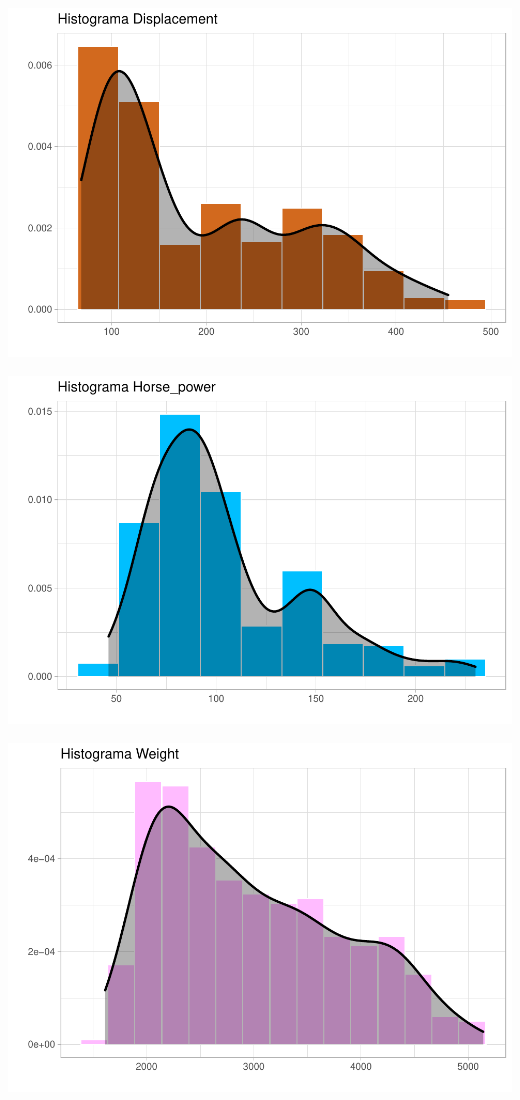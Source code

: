 \begin{center}\includegraphics{img/EDA_files/figure-latex/unnamed-chunk-7-1} \end{center}
\begin{center}\includegraphics{img/EDA_files/figure-latex/unnamed-chunk-7-2} \end{center}
\begin{center}\includegraphics{img/EDA_files/figure-latex/unnamed-chunk-7-3} \end{center}
